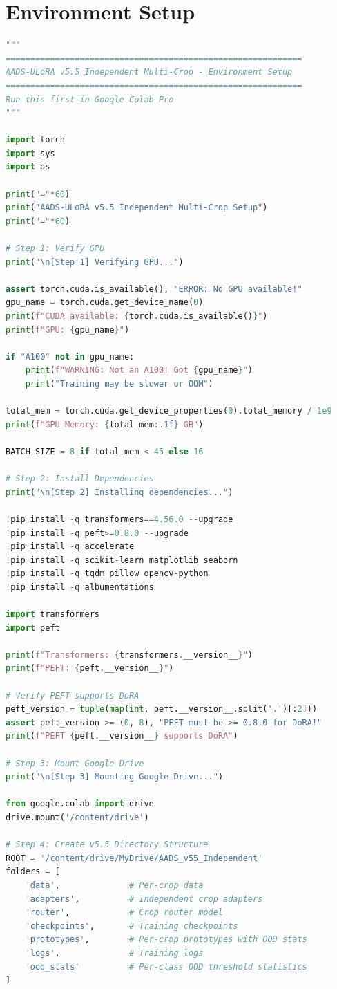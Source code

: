 \documentclass[11pt,a4paper]{article}
\begin{document}
\section{Environment Setup}

\begin{lstlisting}[language=Python, caption={Environment Setup for v5.5}]
"""
============================================================
AADS-ULoRA v5.5 Independent Multi-Crop - Environment Setup
============================================================
Run this first in Google Colab Pro
"""

import torch
import sys
import os

print("="*60)
print("AADS-ULoRA v5.5 Independent Multi-Crop Setup")
print("="*60)

# Step 1: Verify GPU
print("\n[Step 1] Verifying GPU...")

assert torch.cuda.is_available(), "ERROR: No GPU available!"
gpu_name = torch.cuda.get_device_name(0)
print(f"CUDA available: {torch.cuda.is_available()}")
print(f"GPU: {gpu_name}")

if "A100" not in gpu_name:
    print(f"WARNING: Not an A100! Got {gpu_name}")
    print("Training may be slower or OOM")

total_mem = torch.cuda.get_device_properties(0).total_memory / 1e9
print(f"GPU Memory: {total_mem:.1f} GB")

BATCH_SIZE = 8 if total_mem < 45 else 16

# Step 2: Install Dependencies
print("\n[Step 2] Installing dependencies...")

!pip install -q transformers==4.56.0 --upgrade
!pip install -q peft>=0.8.0 --upgrade
!pip install -q accelerate
!pip install -q scikit-learn matplotlib seaborn
!pip install -q tqdm pillow opencv-python
!pip install -q albumentations

import transformers
import peft

print(f"Transformers: {transformers.__version__}")
print(f"PEFT: {peft.__version__}")

# Verify PEFT supports DoRA
peft_version = tuple(map(int, peft.__version__.split('.')[:2]))
assert peft_version >= (0, 8), "PEFT must be >= 0.8.0 for DoRA!"
print(f"PEFT {peft.__version__} supports DoRA")

# Step 3: Mount Google Drive
print("\n[Step 3] Mounting Google Drive...")

from google.colab import drive
drive.mount('/content/drive')

# Step 4: Create v5.5 Directory Structure
ROOT = '/content/drive/MyDrive/AADS_v55_Independent'
folders = [
    'data',              # Per-crop data
    'adapters',          # Independent crop adapters
    'router',            # Crop router model
    'checkpoints',       # Training checkpoints
    'prototypes',        # Per-crop prototypes with OOD stats
    'logs',              # Training logs
    'ood_stats'          # Per-class OOD threshold statistics
]


\end{lstlisting}
\end{document}
